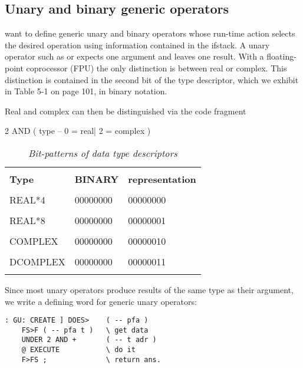 \subsection{Unary and binary generic operators}

 want to define generic unary and binary operators whose run-time action selects the desired operation using information contained in the ifstack. A unary operator such as  or  expects one argument and leaves one result. With a floating-point coprocessor (FPU) the only distinction is between real or complex. This distinction is contained in the second bit of the type descriptor, which we exhibit in Table 5-1 on page 101, in binary notation.

Real and complex can then be distinguished via the code fragment

2 AND ( type -- 0 = real| 2 = complex )

\begin{table}
    \centering
    \caption{\textit{Bit-patterns of data type descriptors}}
        \bigskip
    \label{tbl:09_01} 
    \setlength{\tabcolsep}{30pt}
        \begin{tabular}{|lll|}
            \hline
            & &\\
            \textbf{Type} & \textbf{BINARY} & \textbf{representation} \\
            & &\\
            REAL*4     &  00000000 & 00000000 \\
            & &\\
            REAL*8     &  00000000 & 00000001 \\
            & &\\
            COMPLEX    &  00000000 & 00000010 \\
            & &\\
            DCOMPLEX   &  00000000 & 00000011 \\
            &&\\
            \hline 
        \end{tabular}
\end{table}


Since most unary operators produce results of the same type as their argument, we write a defining word for generic unary operators:

\begin{lstlisting}
: GU: CREATE ] DOES>    ( -- pfa )
    FS>F ( -- pfa t )   \ get data
    UNDER 2 AND +       ( -- t adr )
    @ EXECUTE           \ do it
    F>FS ;              \ return ans.
\end{lstlisting}

